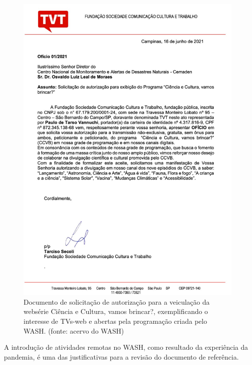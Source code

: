\captionsetup{format=plain}
\begin{figure}[p]

\centering


\begin{minipage}[b]{0.4\linewidth}
        \centering
                \includegraphics[width=1.0\linewidth]{../../../imagens/TVT.jpg}
                \caption{Documento de solicitação de autorização para a veiculação da websérie Ciência e Cultura, vamos brincar?, exemplificando o interesse de TVs-web e abertas pela programação criada pelo WASH. (fonte: acervo do WASH)}
                \label{51f9418c1ca6e2404e9d774513fb6c023d10b3bb}
\end{minipage}%
\hspace{0.5cm}
\end{figure}



A introdução de atividades remotas no WASH, como resultado da experiência da pandemia, é uma das justificativas para a revisão do documento de referência.

